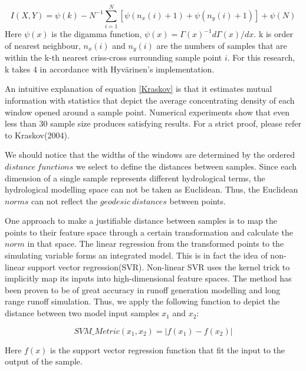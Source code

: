 \documentclass[draft,wrr]{AGUTeX}
\begin{document}
\begin{article}
\begin{equation}\label{Kraskov}
I(X,Y)=\psi(k)-N^{-1}\sum_{i=1}^{N}[\psi(n_x(i)+1)+\psi(n_y(i)+1)]+\psi(N)
\end{equation}
Here $\psi(x)$ is the digamma function, $\psi(x)=\Gamma(x)^{-1}d\Gamma(x)/dx$. k is order of nearest neighbour, $n_x(i)$ and $n_y(i)$ are the numbers of samples that are within the k-th nearest  criss-cross surrounding sample point $i$. For this research, k takes 4 in accordance with Hyv{\"a}rinen's implementation.

An intuitive explanation of equation \eqref{Kraskov} is that it estimates mutual information with statistics that depict the average concentrating density of each window opened around a sample point. Numerical experiments show that even less than 30 sample size produces satisfying results. For a strict proof, please refer to Kraskov(2004).

We should notice that the widths of the windows are determined by the ordered $distance~functions$ we select to define the distances between samples. Since each dimension of a single sample represents different hydrological terms, the hydrological modelling space can not be taken as Euclidean. Thus, the Euclidean $norms$ can not reflect the $geodesic      ~distances$ between points. 
 
 
One approach to make a justifiable distance between samples   is to map the points to their feature space through a certain transformation and calculate the $norm$ in that space. The linear regression from the transformed points to the simulating variable forms an integrated model. This is in fact the idea of non-linear support vector regression(SVR). Non-linear SVR uses the kernel trick to implicitly map its inputs into high-dimensional feature spaces. The method has been proven to be of great accuracy in runoff generation modelling\citep{dibike2001model,asefa2006multi,behzad2009generalization,phdgong} and long range runoff simulation\citep{lin2006using}. Thus, we apply the following function to depict the distance between two model input samples $x_1$ and $x_2$:

\begin{equation}\label{svm}
SVM\_Metric(x_1,x_2)=|f(x_1)-f(x_2)|
\end{equation}

Here $f(x)$ is the support vector regression function that fit the input to the output of the sample.   


\end{article}
\end{document}
